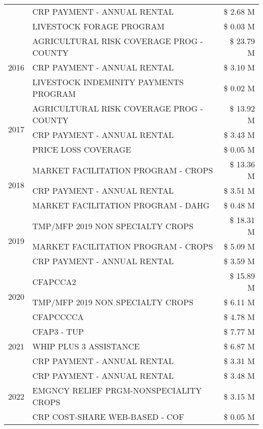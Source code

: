 \begin{tabular}{llr}
 & CRP PAYMENT - ANNUAL RENTAL & \$ 2.68 M \\
 & LIVESTOCK FORAGE PROGRAM & \$ 0.03 M \\
\cline{1-3}
\multirow[t]{3}{*}{2016} & AGRICULTURAL RISK COVERAGE PROG - COUNTY & \$ 23.79 M \\
 & CRP PAYMENT - ANNUAL RENTAL & \$ 3.10 M \\
 & LIVESTOCK INDEMINITY PAYMENTS PROGRAM & \$ 0.02 M \\
\cline{1-3}
\multirow[t]{3}{*}{2017} & AGRICULTURAL RISK COVERAGE PROG - COUNTY & \$ 13.92 M \\
 & CRP PAYMENT - ANNUAL RENTAL & \$ 3.43 M \\
 & PRICE LOSS COVERAGE & \$ 0.05 M \\
\cline{1-3}
\multirow[t]{3}{*}{2018} & MARKET FACILITATION PROGRAM - CROPS & \$ 13.36 M \\
 & CRP PAYMENT - ANNUAL RENTAL & \$ 3.51 M \\
 & MARKET FACILITATION PROGRAM - DAHG & \$ 0.48 M \\
\cline{1-3}
\multirow[t]{3}{*}{2019} & TMP/MFP 2019 NON SPECIALTY CROPS & \$ 18.31 M \\
 & MARKET FACILITATION PROGRAM - CROPS & \$ 5.09 M \\
 & CRP PAYMENT - ANNUAL RENTAL & \$ 3.59 M \\
\cline{1-3}
\multirow[t]{3}{*}{2020} & CFAPCCA2 & \$ 15.89 M \\
 & TMP/MFP 2019 NON SPECIALTY CROPS & \$ 6.11 M \\
 & CFAPCCCCA & \$ 4.78 M \\
\cline{1-3}
\multirow[t]{3}{*}{2021} & CFAP3 - TUP & \$ 7.77 M \\
 & WHIP PLUS 3 ASSISTANCE & \$ 6.87 M \\
 & CRP PAYMENT - ANNUAL RENTAL & \$ 3.31 M \\
\cline{1-3}
\multirow[t]{3}{*}{2022} & CRP PAYMENT - ANNUAL RENTAL & \$ 3.48 M \\
 & EMGNCY RELIEF PRGM-NONSPECIALITY CROPS & \$ 3.15 M \\
 & CRP COST-SHARE WEB-BASED - COF & \$ 0.05 M \\
\cline{1-3}
\bottomrule
\end{tabular}
